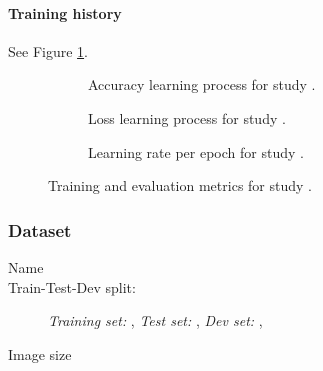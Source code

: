 \documentclass[10pt]{article}
\begin{document}
    \paragraph*{Training history} See Figure \ref{fig:results\VAR{summary['model']['reportnumber']}}.
    \begin{figure}[H]
        \centering
        \begin{subfigure}{.5\textwidth}
            \caption{Accuracy learning process for study \protect\hyperref[training:\VAR{summary['model']['reportnumber']}]
                        {}.}
        \end{subfigure}%
        \hfill%
        \begin{subfigure}{.5\textwidth}
            \caption{Loss learning process for study \protect\hyperref[training:\VAR{summary['model']['reportnumber']}]
                        {}.}
        \end{subfigure}
        \par\bigskip
        \begin{subfigure}{.5\textwidth}
            \caption{Learning rate per epoch for study \protect\hyperref[training:\VAR{summary['model']['reportnumber']}]
                        {}.}
        \end{subfigure}%
        \caption{Training and evaluation metrics for study  \protect\hyperref[training:\VAR{summary['model']['reportnumber']}]
                    {}.
                \label{fig:results\VAR{summary['model']['reportnumber']}}}
    \end{figure}

    \newpage


    \subsubsection*{Dataset}
    \begin{description}
        \item[Name] 
        \item[Train-Test-Dev split:] {\it Training set:}
        ,
        {\it Test set:}
        ,
        {\it Dev set:}
        ,
        \item[Image size] 
    \end{description}
\end{document}
